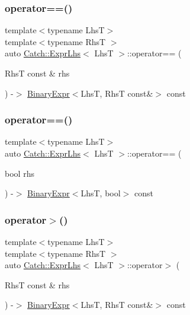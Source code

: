 \subsubsection{\texorpdfstring{operator==()}{operator==()}\hspace{0.1cm}{\footnotesize\ttfamily [1/2]}}
{\footnotesize\ttfamily template$<$typename LhsT$>$ \\
template$<$typename RhsT $>$ \\
auto \mbox{\hyperlink{classCatch_1_1ExprLhs}{Catch\+::\+Expr\+Lhs}}$<$ LhsT $>$\+::operator== (\begin{DoxyParamCaption}\item[{RhsT const \&}]{rhs }\end{DoxyParamCaption}) -\/$>$ \mbox{\hyperlink{classCatch_1_1BinaryExpr}{Binary\+Expr}}$<$LhsT, RhsT const\&$>$ const \hspace{0.3cm}{\ttfamily [inline]}}

\mbox{\label{classCatch_1_1ExprLhs_ab707a84abdffbdc35962a495e238d393}} 
\subsubsection{\texorpdfstring{operator==()}{operator==()}\hspace{0.1cm}{\footnotesize\ttfamily [2/2]}}
{\footnotesize\ttfamily template$<$typename LhsT$>$ \\
auto \mbox{\hyperlink{classCatch_1_1ExprLhs}{Catch\+::\+Expr\+Lhs}}$<$ LhsT $>$\+::operator== (\begin{DoxyParamCaption}\item[{bool}]{rhs }\end{DoxyParamCaption}) -\/$>$ \mbox{\hyperlink{classCatch_1_1BinaryExpr}{Binary\+Expr}}$<$LhsT, bool$>$ const \hspace{0.3cm}{\ttfamily [inline]}}

\mbox{\label{classCatch_1_1ExprLhs_a23cb0cd983a1ac9c3df5160542199b83}} 
\subsubsection{\texorpdfstring{operator$>$()}{operator>()}}
{\footnotesize\ttfamily template$<$typename LhsT$>$ \\
template$<$typename RhsT $>$ \\
auto \mbox{\hyperlink{classCatch_1_1ExprLhs}{Catch\+::\+Expr\+Lhs}}$<$ LhsT $>$\+::operator$>$ (\begin{DoxyParamCaption}\item[{RhsT const \&}]{rhs }\end{DoxyParamCaption}) -\/$>$ \mbox{\hyperlink{classCatch_1_1BinaryExpr}{Binary\+Expr}}$<$LhsT, RhsT const\&$>$ const \hspace{0.3cm}{\ttfamily [inline]}}


